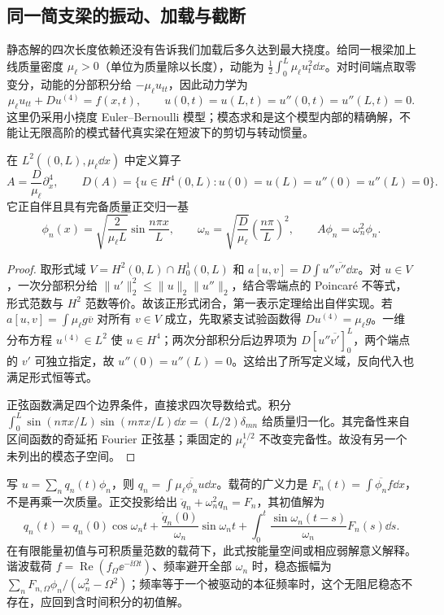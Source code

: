 \subsection{同一简支梁的振动、加载与截断}

静态解的四次长度依赖还没有告诉我们加载后多久达到最大挠度。给同一根梁加上线质量密度 $\mu_\ell>0$（单位为质量除以长度），动能为 $\tfrac12\int_0^L\mu_\ell u_t^2\dd x$。对时间端点取零变分，动能的分部积分给 $-\mu_\ell u_{tt}$，因此动力学为
\[
 \mu_\ell u_{tt}+Du^{(4)}=f(x,t),\qquad
 u(0,t)=u(L,t)=u''(0,t)=u''(L,t)=0.
\]
这里仍采用小挠度 Euler--Bernoulli 模型；模态求和是这个模型内部的精确解，不能让无限高阶的模式替代真实梁在短波下的剪切与转动惯量。

\begin{proposition}[简支梁的质量归一化模态]
在 $L^2((0,L),\mu_\ell\dd x)$ 中定义算子
\[
 A=\frac{D}{\mu_\ell}\partial_x^4,\qquad
 D(A)=\{u\in H^4(0,L):u(0)=u(L)=u''(0)=u''(L)=0\}.
\]
它正自伴且具有完备质量正交归一基
\begin{equation}
 \phi_n(x)=\sqrt{\frac{2}{\mu_\ell L}}\sin\frac{n\pi x}{L},
 \qquad \omega_n=\sqrt{\frac D{\mu_\ell}}\left(\frac{n\pi}{L}\right)^2,
 \qquad A\phi_n=\omega_n^2\phi_n.
 \label{eq:phys-cont-beam-mass-modes}
\end{equation}
\end{proposition}

\begin{proof}
取形式域 $V=H^2(0,L)\cap H_0^1(0,L)$ 和
$a[u,v]=D\int u''\overline{v''}\dd x$。对 $u\in V$，一次分部积分给
$\|u'\|_2^2\le\|u\|_2\|u''\|_2$，结合零端点的 Poincar\'e 不等式，形式范数与 $H^2$ 范数等价。故该正形式闭合，第一表示定理给出自伴实现。若 $a[u,v]=\int\mu_\ell g\overline v$ 对所有 $v\in V$ 成立，先取紧支试验函数得 $Du^{(4)}=\mu_\ell g$。一维分布方程 $u^{(4)}\in L^2$ 使 $u\in H^4$；两次分部积分后边界项为 $D[u''\overline{v'}]_0^L$，两个端点的 $v'$ 可独立指定，故 $u''(0)=u''(L)=0$。这给出了所写定义域，反向代入也满足形式恒等式。

正弦函数满足四个边界条件，直接求四次导数给式。积分 $\int_0^L\sin(n\pi x/L)\sin(m\pi x/L)\dd x=(L/2)\delta_{mn}$ 给质量归一化。其完备性来自区间函数的奇延拓 Fourier 正弦基；乘固定的 $\mu_\ell^{1/2}$ 不改变完备性。故没有另一个未列出的模态子空间。
\end{proof}

写 $u=\sum_n q_n(t)\phi_n$，则 $q_n=\int\mu_\ell\overline{\phi_n}u\dd x$。载荷的广义力是 $F_n(t)=\int\overline{\phi_n}f\dd x$，不是再乘一次质量。正交投影给出 $\ddot q_n+\omega_n^2q_n=F_n$，其初值解为
\begin{equation}
 q_n(t)=q_n(0)\cos\omega_nt+\frac{\dot q_n(0)}{\omega_n}\sin\omega_nt
 +\int_0^t\frac{\sin\omega_n(t-s)}{\omega_n}F_n(s)\dd s.
 \label{eq:phys-cont-beam-modal-dynamics}
\end{equation}
在有限能量初值与可积质量范数的载荷下，此式按能量空间或相应弱解意义解释。谐波载荷 $f=\operatorname{Re}(f_\Omega\ee^{-\ii\Omega t})$、频率避开全部 $\omega_n$ 时，稳态振幅为 $\sum_n F_{n,\Omega}\phi_n/(\omega_n^2-\Omega^2)$；频率等于一个被驱动的本征频率时，这个无阻尼稳态不存在，应回到含时间积分的初值解。

